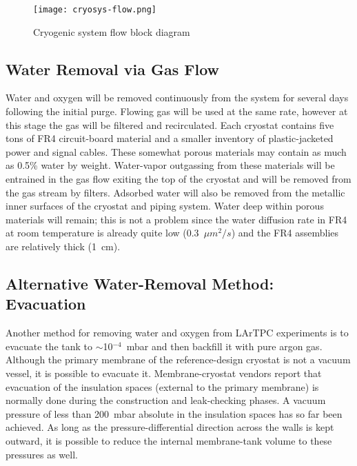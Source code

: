 \begin{figure}[htbp]
\centering
\texttt{[image: cryosys-flow.png]} 
\caption{Cryogenic system flow block diagram}
\label{fig:v5ch2-LBNF-cryo-process-2014}
\end{figure}



\subsection{Water Removal via Gas Flow}

Water and oxygen will be removed continuously from the system for several days following the
initial purge. Flowing gas will be used at the same rate, however at this stage the gas will
be filtered and recirculated. Each cryostat contains five tons of FR4
circuit-board material and a
smaller inventory of plastic-jacketed power and signal cables. These somewhat porous
materials may contain as much as 0.5\% water by weight. Water-vapor outgassing from these
materials will be entrained in the gas flow exiting
the top of the cryostat and will be removed
from the gas stream by filters. Adsorbed water will also be removed from the metallic inner
surfaces of the cryostat and piping system. Water deep within porous materials will remain;
this is not a problem since
the water diffusion rate in FR4 at room temperature is already 
quite low (0.3~$\mu m^2 /s$) and the FR4 assemblies are relatively thick (1~cm).

\subsection{Alternative Water-Removal Method: Evacuation}

Another method for removing water and oxygen from LArTPC experiments 
is to evacuate the tank to $\sim$10$^{-4}$~mbar  and then backfill it with 
pure argon gas. Although the primary membrane of the reference-design 
cryostat is not a vacuum vessel, it is possible to evacuate it.
Membrane-cryostat vendors report that evacuation of  the insulation 
spaces (external to the primary membrane) is normally done during the 
construction and leak-checking phases.  A vacuum pressure of less than 
200~mbar absolute in the insulation spaces has so far been achieved. 
As long as the pressure-differential direction across the walls is 
kept outward, it is possible to reduce the internal membrane-tank 
volume to these pressures as well.  


